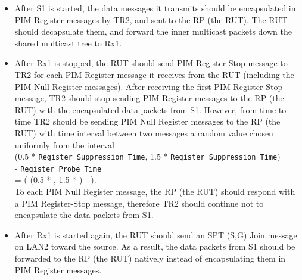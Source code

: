 \documentclass[11pt]{report}
\begin{document}


\begin{itemize}

  \item After S1 is started, the data messages it transmits should be
  encapsulated in PIM Register messages by TR2, and sent to the RP (the
  RUT). The RUT should decapsulate them, and forward the inner multicast
  packets down the shared multicast tree to Rx1.

  \item After Rx1 is stopped, the RUT should send PIM Register-Stop message to
  TR2 for each PIM Register message it receives from the RUT (including
  the PIM Null Register messages). After receiving the first PIM Register-Stop
  message, TR2 should stop sending PIM Register messages to the RP (the RUT)
  with the encapsulated data packets from S1.
  However, from time to time TR2 should be sending PIM Null Register
  messages to the RP (the RUT) with time interval between two messages a random
  value chosen uniformly from the interval \\
  (0.5 * \verb=Register_Suppression_Time=,
  1.5 * \verb=Register_Suppression_Time=) \\
  - \verb=Register_Probe_Time= \\
  = ( (0.5 * {\PimsmRegisterSuppressionTime}, 1.5 *
  {\PimsmRegisterSuppressionTime}) - {\PimsmRegisterProbeTime} ). \\
  To each PIM Null Register message, the RP (the RUT) should respond with a
  PIM Register-Stop message, therefore TR2 should continue not to
  encapsulate the data packets from S1.

  \item After Rx1 is started again, the RUT should send an SPT (S,G) Join
  message on LAN2 toward the source. As a result, the data packets from S1
  should be forwarded to the RP (the RUT) natively instead of encapsulating
  them in PIM Register messages.

\end{itemize}

\end{document}
